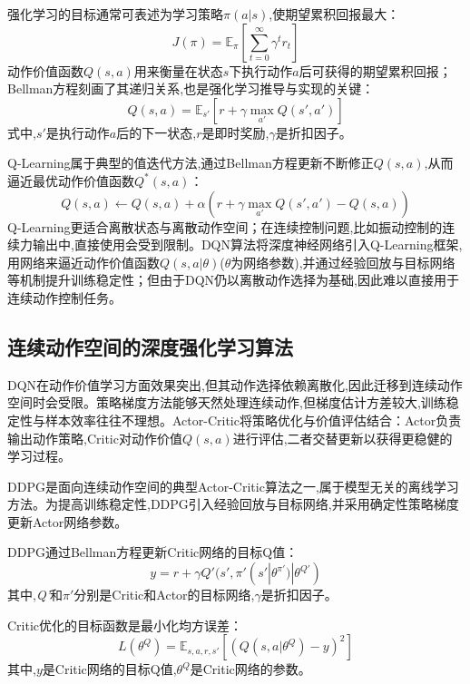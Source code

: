 \documentclass{scrbook}
\begin{document}
{强化学习的目标通常可表述为学习策略$\pi (a| s)$,使期望累积回报最大：
\begin{equation}
\tag{2-23}
J(\pi )=\mathrm{\mathbb{E}}_{\pi }\left[\sum \limits_{t=0}^{\infty }\gamma ^{t}r_{t}\right]
\end{equation}
动作价值函数$Q(s,a)$用来衡量在状态$s$下执行动作$a$后可获得的期望累积回报；Bellman方程\cite{bib48}刻画了其递归关系,也是强化学习推导与实现的关键：
\begin{equation}
\tag{2-24}
Q(s,a)=\mathrm{\mathbb{E}}_{s'}\left[r+\gamma \max _{a'}Q(s',a')\right]
\end{equation}
式中,$s'$是执行动作$a$后的下一状态,$r$是即时奖励,$\gamma $是折扣因子。

Q-Learning属于典型的值迭代方法,通过Bellman方程更新不断修正$Q(s,a)$,从而逼近最优动作价值函数$Q^{*}(s,a)$：
\begin{equation}
\tag{2-25}
Q(s,a)\leftarrow Q(s,a)+\alpha \left(r+\gamma \max _{a'}Q(s',a')-Q(s,a)\right)
\end{equation}
Q-Learning更适合离散状态与离散动作空间；在连续控制问题,比如振动控制的连续力输出中,直接使用会受到限制。DQN算法将深度神经网络引入Q-Learning框架,用网络来逼近动作价值函数$Q(s,a| \theta )$($\theta $为网络参数),并通过经验回放与目标网络等机制提升训练稳定性；但由于DQN仍以离散动作选择为基础,因此难以直接用于连续动作控制任务。

\subsection{\label{ref-038}连续动作空间的深度强化学习算法\label{mark-2.3.3}}

DQN在动作价值学习方面效果突出,但其动作选择依赖离散化,因此迁移到连续动作空间时会受限。策略梯度方法能够天然处理连续动作,但梯度估计方差较大,训练稳定性与样本效率往往不理想。Actor-Critic将策略优化与价值评估结合：Actor负责输出动作策略,Critic对动作价值$Q(s,a)$进行评估,二者交替更新以获得更稳健的学习过程。

DDPG是面向连续动作空间的典型Actor-Critic算法之一,属于模型无关的离线学习方法。为提高训练稳定性,DDPG引入经验回放与目标网络,并采用确定性策略梯度更新Actor网络参数。

DDPG通过Bellman方程\cite{bib49}更新Critic网络的目标Q值：
\begin{equation}
\tag{2-26}
y=r+\gamma Q'(s',\pi '(s'| \theta ^{\pi '})| \theta ^{Q'})
\end{equation}
其中,\textit{Q'}和$\pi '$分别是Critic和Actor的目标网络,$\gamma $是折扣因子。

Critic优化的目标函数是最小化均方误差：
\begin{equation}
\tag{2-27}
L(\theta ^{Q})=\mathrm{\mathbb{E}}_{s,a,r,s'}\left[(Q(s,a| \theta ^{Q})-y)^{2}\right]
\end{equation}
其中,$y$是Critic网络的目标Q值,$\theta ^{Q}$是Critic网络的参数。

}
\end{document}
